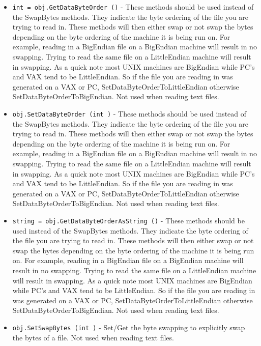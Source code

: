 \begin{itemize}
\item  \verb|int = obj.GetDataByteOrder ()| -  These methods should be used instead of the SwapBytes methods.
 They indicate the byte ordering of the file you are trying
 to read in. These methods will then either swap or not swap
 the bytes depending on the byte ordering of the machine it is
 being run on. For example, reading in a BigEndian file on a
 BigEndian machine will result in no swapping. Trying to read
 the same file on a LittleEndian machine will result in swapping.
 As a quick note most UNIX machines are BigEndian while PC's
 and VAX tend to be LittleEndian. So if the file you are reading
 in was generated on a VAX or PC, SetDataByteOrderToLittleEndian 
 otherwise SetDataByteOrderToBigEndian. Not used when reading
 text files. 

\item  \verb|obj.SetDataByteOrder (int )| -  These methods should be used instead of the SwapBytes methods.
 They indicate the byte ordering of the file you are trying
 to read in. These methods will then either swap or not swap
 the bytes depending on the byte ordering of the machine it is
 being run on. For example, reading in a BigEndian file on a
 BigEndian machine will result in no swapping. Trying to read
 the same file on a LittleEndian machine will result in swapping.
 As a quick note most UNIX machines are BigEndian while PC's
 and VAX tend to be LittleEndian. So if the file you are reading
 in was generated on a VAX or PC, SetDataByteOrderToLittleEndian 
 otherwise SetDataByteOrderToBigEndian. Not used when reading
 text files. 

\item  \verb|string = obj.GetDataByteOrderAsString ()| -  These methods should be used instead of the SwapBytes methods.
 They indicate the byte ordering of the file you are trying
 to read in. These methods will then either swap or not swap
 the bytes depending on the byte ordering of the machine it is
 being run on. For example, reading in a BigEndian file on a
 BigEndian machine will result in no swapping. Trying to read
 the same file on a LittleEndian machine will result in swapping.
 As a quick note most UNIX machines are BigEndian while PC's
 and VAX tend to be LittleEndian. So if the file you are reading
 in was generated on a VAX or PC, SetDataByteOrderToLittleEndian 
 otherwise SetDataByteOrderToBigEndian. Not used when reading
 text files. 

\item  \verb|obj.SetSwapBytes (int )| -  Set/Get the byte swapping to explicitly swap the bytes of a file.
 Not used when reading text files.


\end{itemize}
